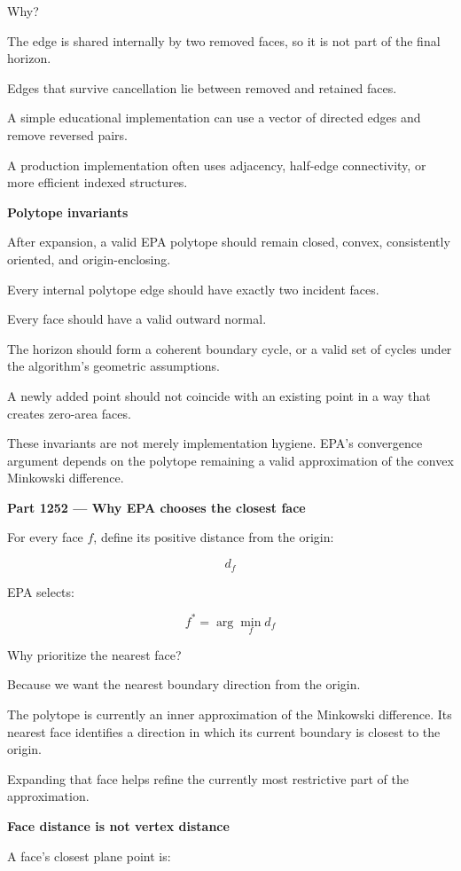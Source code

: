 Why?

The edge is shared internally by two removed faces, so it is not part of the final horizon.

Edges that survive cancellation lie between removed and retained faces.

A simple educational implementation can use a vector of directed edges and remove reversed pairs.

A production implementation often uses adjacency, half-edge connectivity, or more efficient indexed structures.

\textbf{Polytope invariants}

After expansion, a valid EPA polytope should remain closed, convex, consistently oriented, and origin-enclosing.

Every internal polytope edge should have exactly two incident faces.

Every face should have a valid outward normal.

The horizon should form a coherent boundary cycle, or a valid set of cycles under the algorithm's geometric assumptions.

A newly added point should not coincide with an existing point in a way that creates zero-area faces.

These invariants are not merely implementation hygiene. EPA's convergence argument depends on the polytope remaining a valid approximation of the convex Minkowski difference.

\textbf{Part 1252 --- Why EPA chooses the closest face}

For every face \(f\), define its positive distance from the origin:

\[
d_f
\]

EPA selects:

\[
\boxed{ f^*=\arg\min_f d_f }
\]

Why prioritize the nearest face?

Because we want the nearest boundary direction from the origin.

The polytope is currently an inner approximation of the Minkowski difference. Its nearest face identifies a direction in which its current boundary is closest to the origin.

Expanding that face helps refine the currently most restrictive part of the approximation.

\textbf{Face distance is not vertex distance}

A face's closest plane point is:


